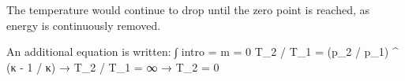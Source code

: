The temperature would continue to drop until the zero point is reached, as energy is continuously removed.  

An additional equation is written:  
∫ intro = m = 0  
T_2 / T_1 = (p_2 / p_1) ^ (κ - 1 / κ)  
→ T_2 / T_1 = ∞  
→ T_2 = 0